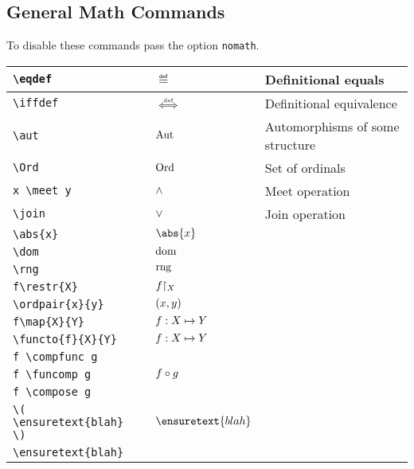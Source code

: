 \documentclass[11pt,oneside]{amsart}
\newcommand{\tab}{\hspace{1cm}}
\begin{document}
\subsection{General Math Commands}
To disable these commands pass the option \verb=nomath=.

\begin{tabular}{l |  l | l}                                
	\verb=\eqdef= 					& \( \eqdef \) & Definitional equals\\
	\midrule
	\verb=\iffdef= 					& \( \stackrel{\text{\tiny def}}{\iff} \) & Definitional equivalence\\
	\midrule
	\verb=\aut= 					& \( \operatorname{Aut} \)  & Automorphisms of some structure\\
	\midrule
	\verb=\Ord= 					& \( \operatorname{Ord} \) & Set of ordinals\\
	\midrule
	\verb=x \meet y= 					& \( \mathbin{\wedge} \) & Meet operation \\
	\verb=\join= 					& \( \mathbin{\vee} \) & Join operation \\
	\verb=\abs{x}= 					& \( \abs{x} \)\\
	\verb=\dom= 					& \( \operatorname{dom} \) \\
	\verb=\rng= 					& \( \operatorname{rng} \) \\
	\verb=f\restr{X}= 				& \( f\mathpunct{\restriction_{X}} \) \\
	\verb=\ordpair{x}{y}= 				& \( \left( x, y \right) \)\\
	\verb=f\map{X}{Y}= 				& \( f:X\mapsto Y \) \\
	\verb=\functo{f}{X}{Y}= 			& \( f:X\mapsto Y \) \\
	
	\verb=f \compfunc g=		       		& \multirow{3}{*}{\( f \mathbin{\circ} g \)} \\
	\tab \verb=f \funcomp g=	            		&\\
	\tab \verb=f \compose g=	            		&\\
	
	\verb=\( \ensuretext{blah} \)=	           	& \( \ensuretext{blah} \)\\
	\verb=\ensuretext{blah}=			&
\end{tabular}                                                          
\end{document}
